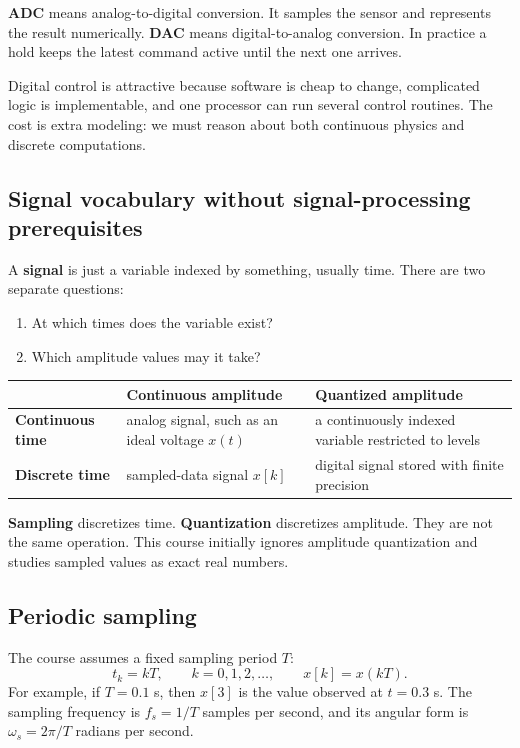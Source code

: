 \documentclass[11pt]{article}
\newcommand{\term}[1]{\textbf{#1}}
\begin{document}
\term{ADC} means analog-to-digital conversion. It samples the sensor and represents the result numerically. \term{DAC} means digital-to-analog conversion. In practice a hold keeps the latest command active until the next one arrives.

Digital control is attractive because software is cheap to change, complicated logic is implementable, and one processor can run several control routines. The cost is extra modeling: we must reason about both continuous physics and discrete computations.

\subsection{Signal vocabulary without signal-processing prerequisites}

A \term{signal} is just a variable indexed by something, usually time. There are two separate questions:

\begin{enumerate}
  \item At which times does the variable exist?
  \item Which amplitude values may it take?
\end{enumerate}

\begin{center}
\begin{tabular}{>{\bfseries}p{}p{}p{}}
\toprule
 & Continuous amplitude & Quantized amplitude\\
\midrule
Continuous time & analog signal, such as an ideal voltage $x(t)$ & a continuously indexed variable restricted to levels\\
Discrete time & sampled-data signal $x[k]$ & digital signal stored with finite precision\\
\bottomrule
\end{tabular}
\end{center}

\term{Sampling} discretizes time. \term{Quantization} discretizes amplitude. They are not the same operation. This course initially ignores amplitude quantization and studies sampled values as exact real numbers.

\subsection{Periodic sampling}

The course assumes a fixed sampling period $T$:
\[
t_k=kT,\qquad k=0,1,2,\ldots,
\qquad x[k]=x(kT).
\]
For example, if $T=0.1$ s, then $x[3]$ is the value observed at $t=0.3$ s. The sampling frequency is $f_s=1/T$ samples per second, and its angular form is $\omega_s=2\pi/T$ radians per second.
\end{document}
